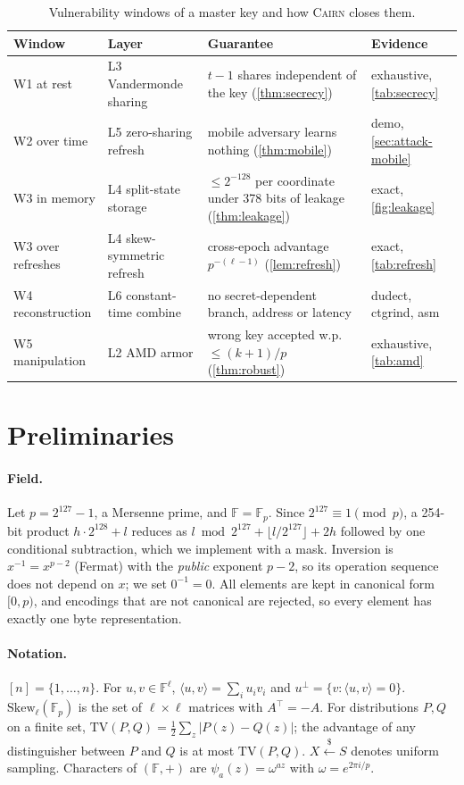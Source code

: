 \documentclass[10.5pt,a4paper]{article}
\theoremstyle{plain}
\theoremstyle{definition}
\newcommand{\F}{\mathbb{F}}
\newcommand{\Fp}{\mathbb{F}_p}
\newcommand{\ip}[2]{\langle #1,#2\rangle}
\newcommand{\TV}{\mathrm{TV}}
\newcommand{\Skew}{\mathrm{Skew}_\ell(\Fp)}
\newcommand{\getsr}{\xleftarrow{\$}}
\newcommand{\cairn}{\textsc{Cairn}}
\begin{document}
\begin{table}[t]
\centering\small
\begin{tabularx}{\textwidth}{@{}l l X l@{}}
\toprule
Window & Layer & Guarantee & Evidence\\
\midrule
W1 at rest & L3 Vandermonde sharing & $t-1$ shares independent of the key (\cref{thm:secrecy}) & exhaustive, \cref{tab:secrecy}\\
W2 over time & L5 zero-sharing refresh & mobile adversary learns nothing (\cref{thm:mobile}) & demo, \cref{sec:attack-mobile}\\
W3 in memory & L4 split-state storage & $\le 2^{-128}$ per coordinate under 378 bits of leakage (\cref{thm:leakage}) & exact, \cref{fig:leakage}\\
W3 over refreshes & L4 skew-symmetric refresh & cross-epoch advantage $p^{-(\ell-1)}$ (\cref{lem:refresh}) & exact, \cref{tab:refresh}\\
W4 reconstruction & L6 constant-time combine & no secret-dependent branch, address or latency & dudect, ctgrind, asm\\
W5 manipulation & L2 AMD armor & wrong key accepted w.p.\ $\le (k+1)/p$ (\cref{thm:robust}) & exhaustive, \cref{tab:amd}\\
\bottomrule
\end{tabularx}
\caption{Vulnerability windows of a master key and how \cairn{} closes them.}\label{tab:windows}
\end{table}

\section{Preliminaries}\label{sec:prelim}

\paragraph{Field.} Let $p=2^{127}-1$, a Mersenne prime, and $\F=\Fp$. Since $2^{127}\equiv 1 \pmod p$, a 254-bit product $h\cdot 2^{128}+l$ reduces as $l\bmod 2^{127} + \lfloor l/2^{127}\rfloor + 2h$ followed by one conditional subtraction, which we implement with a mask. Inversion is $x^{-1}=x^{p-2}$ (Fermat) with the \emph{public} exponent $p-2$, so its operation sequence does not depend on $x$; we set $0^{-1}=0$. All elements are kept in canonical form $[0,p)$, and encodings that are not canonical are rejected, so every element has exactly one byte representation.

\paragraph{Notation.} $[n]=\{1,\dots,n\}$. For $u,v\in\F^\ell$, $\ip{u}{v}=\sum_i u_iv_i$ and $u^\perp=\{v:\ip{u}{v}=0\}$. $\Skew$ is the set of $\ell\times\ell$ matrices with $A^\top=-A$. For distributions $P,Q$ on a finite set, $\TV(P,Q)=\frac12\sum_z|P(z)-Q(z)|$; the advantage of any distinguisher between $P$ and $Q$ is at most $\TV(P,Q)$. $X\getsr S$ denotes uniform sampling. Characters of $(\F,+)$ are $\psi_a(z)=\omega^{az}$ with $\omega=e^{2\pi i/p}$.
\end{document}

